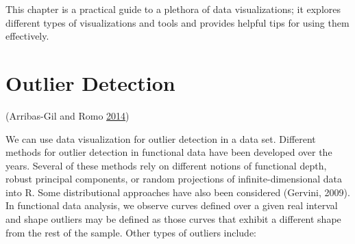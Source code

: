 \documentclass[]{book}
\theoremstyle{definition}
\theoremstyle{definition}
\theoremstyle{definition}
\theoremstyle{remark}
\begin{document}
This chapter is a practical guide to a plethora of data visualizations;
it explores different types of visualizations and tools and provides
helpful tips for using them effectively.

\section{Outlier Detection}\label{outlier-detection}

(Arribas-Gil and Romo \protect\hyperlink{ref-outliar}{2014})

We can use data visualization for outlier detection in a data set.
Different methods for outlier detection in functional data have been
developed over the years. Several of these methods rely on different
notions of functional depth, robust principal components, or random
projections of infinite-dimensional data into R. Some distributional
approaches have also been considered (Gervini, 2009). In functional data
analysis, we observe curves defined over a given real interval and shape
outliers may be defined as those curves that exhibit a different shape
from the rest of the sample. Other types of outliers include:
\end{document}
